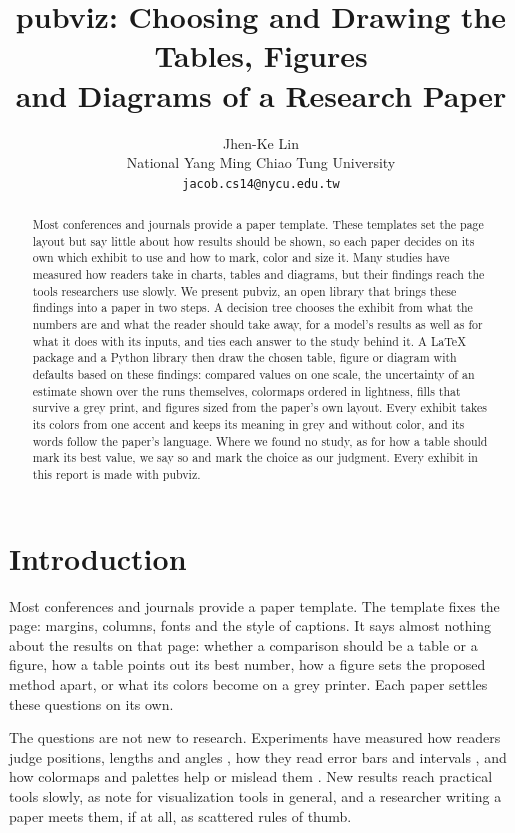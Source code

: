 \documentclass[11pt]{article}
\title{\textbf{pubviz}: Choosing and Drawing the Tables, Figures\\and Diagrams of a Research Paper}
\author{Jhen-Ke Lin\\National Yang Ming Chiao Tung University\\\texttt{jacob.cs14@nycu.edu.tw}}
\date{}
\begin{document}
\maketitle

\begin{abstract}
Most conferences and journals provide a paper template. These templates set
the page layout but say little about how results should be shown, so each
paper decides on its own which exhibit to use and how to mark, color and size
it. Many studies have measured how readers take in charts, tables and
diagrams, but their findings reach the tools researchers use slowly. We
present pubviz, an open library that brings these findings into a paper in
two steps. A decision tree chooses the exhibit from what the numbers are and
what the reader should take away, for a model's results as well as for what
it does with its inputs, and ties each answer to the study behind it. A LaTeX package and a Python library then draw the chosen table, figure
or diagram with defaults based on these findings: compared values on one
scale, the uncertainty of an estimate shown over the runs themselves,
colormaps ordered in lightness, fills that survive a grey print, and figures
sized from the paper's own layout. Every exhibit takes its colors from one
accent and keeps its meaning in grey and without color, and its words follow
the paper's language. Where we found no study, as for how a table should mark
its best value, we say so and mark the choice as our judgment. Every exhibit
in this report is made with pubviz.
\end{abstract}

\section{Introduction}\label{sec:intro}

Most conferences and journals provide a paper template. The template fixes
the page: margins, columns, fonts and the style of captions. It says almost
nothing about the results on that page: whether a comparison should be a
table or a figure, how a table points out its best number, how a figure sets
the proposed method apart, or what its colors become on a grey printer. Each
paper settles these questions on its own.

The questions are not new to research. Experiments have measured how readers
judge positions, lengths and angles
\citep{cleveland1984graphical,heer2010crowdsourcing}, how they read error bars
and intervals \citep{belia2005researchers,correll2014error,hofman2020visualizing},
and how colormaps and palettes help or mislead them
\citep{liu2018rainbow,szafir2018modeling,schloss2019mapping}. New results
reach practical tools slowly, as \citet[Sec.~1]{moritz2019draco} note for
visualization tools in general, and a researcher writing a paper meets them,
if at all, as scattered rules of thumb.
\end{document}
